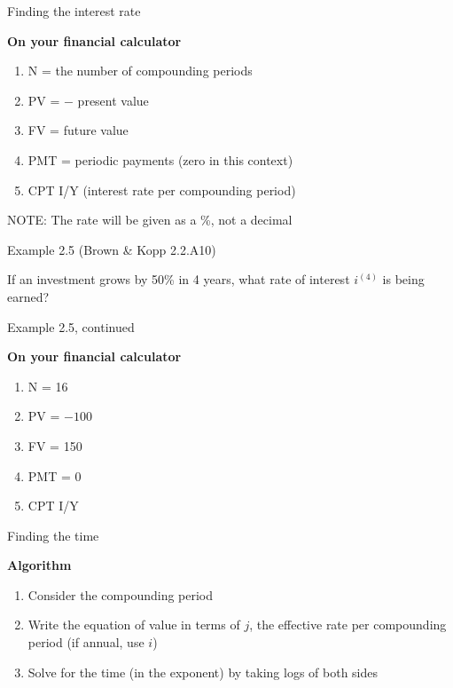 \documentclass{beamer}
\begin{document}
\begin{frame}{Finding the interest rate}

\textbf{On your financial calculator}
\begin{enumerate}
\item N = the number of compounding periods
\item PV = $-$ present value
\item FV = future value
\item PMT = periodic payments (zero in this context)
\item CPT I/Y (interest rate per compounding period)
\end{enumerate}

\bigskip
NOTE: The rate will be given as a \%, not a decimal

\end{frame}

\begin{frame}{Example 2.5 (Brown \& Kopp 2.2.A10)}

If an investment grows by 50\% in 4 years, what rate of interest $i^{(4)}$ is being earned?

\vfill
\end{frame}

\begin{frame}{Example 2.5, continued}

\textbf{On your financial calculator}
\begin{enumerate}
\item N = 16
\item PV = $-100$
\item FV = 150
\item PMT = 0
\item CPT I/Y
\end{enumerate}

\vfill
\end{frame}

\begin{frame}{Finding the time}

\textbf{Algorithm}
\begin{enumerate}
\item Consider the compounding period
\item Write the equation of value in terms of $j$, the effective rate per compounding period (if annual, use $i$)
\item Solve for the time (in the exponent) by taking logs of both sides
\end{enumerate}

\end{frame}
\end{document}
